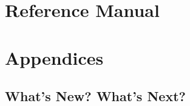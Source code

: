 \part{Reference Manual}



\appendix

\part[Appendices]{Appendices}

%

\chapter{What's New?  What's Next?}










